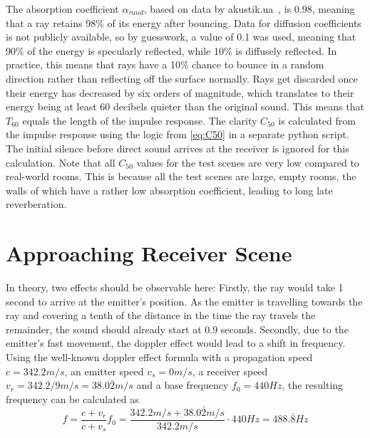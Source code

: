 The absorption coefficient \(\alpha_{rand}\), based on data by akustik.ua~\cite{A14},
is 0.98, meaning that a ray retains 98\% of its energy after bouncing.
Data for diffusion coefficients is not publicly available, so by guesswork, a value of 0.1 was used,
meaning that 90\% of the energy is specularly reflected, while 10\% is diffusely reflected.
In practice, this means that rays have a 10\% chance to bounce in a random direction rather than reflecting off the surface normally.
\newline
Rays get discarded once their energy has decreased by six orders of magnitude,
which translates to their energy being at least 60 decibels quieter than the original sound.
This means that \(T_{60}\) equals the length of the impulse response.
The clarity \(C_{50}\) is calculated from the impulse response using the logic from \ref{eq:C50}
in a separate python script.
The initial silence before direct sound arrives at the receiver is ignored for this calculation.
\newline
Note that all \(C_{50}\) values for the test scenes are very low compared to real-world rooms.
This is because all the test scenes are large, empty rooms,
the walls of which have a rather low absorption coefficient,
leading to long late reverberation.

\section{Approaching Receiver Scene}

In theory, two effects should be observable here:
\newline
Firstly, the ray would take 1 second to arrive at the emitter's position.
As the emitter is travelling towards the ray and covering a tenth of the distance in the time the ray travels the remainder,
the sound should already start at 0.9 seconds.
\newline
Secondly, due to the emitter's fast movement,
the doppler effect would lead to a shift in frequency.
\newline
Using the well-known doppler effect formula with a propagation speed \(c = 342.2 m/s\), an emitter speed \(v_s = 0 m/s\),
a receiver speed \(v_r = 342.2/9 m/s = 38.0\bar{2} m/s\) and a base frequency \(f_0 = 440 Hz\),
the resulting frequency can be calculated as
\begin{equation}\label{eq:Doppler}
    f = \frac{c + v_r}{c + v_s} f_0 = \frac{342.2 m/s + 38.0\bar{2} m/s}{342.2 m/s} \cdot 440Hz = 488.\bar{8} Hz
\end{equation}


